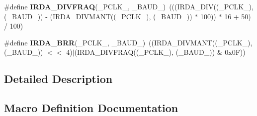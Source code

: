 \begin{DoxyCompactItemize}
\item 
\#define {\bfseries I\+R\+D\+A\+\_\+\+D\+I\+V\+F\+R\+AQ}(\+\_\+\+P\+C\+L\+K\+\_\+,  \+\_\+\+B\+A\+U\+D\+\_\+)~(((I\+R\+D\+A\+\_\+\+D\+IV((\+\_\+\+P\+C\+L\+K\+\_\+), (\+\_\+\+B\+A\+U\+D\+\_\+)) -\/ (I\+R\+D\+A\+\_\+\+D\+I\+V\+M\+A\+NT((\+\_\+\+P\+C\+L\+K\+\_\+), (\+\_\+\+B\+A\+U\+D\+\_\+)) $\ast$ 100)) $\ast$ 16 + 50) / 100)\hypertarget{group___i_r_d_a___private___macros_ga3245c6313dd792d63e20ca702f6f2a58}{}\label{group___i_r_d_a___private___macros_ga3245c6313dd792d63e20ca702f6f2a58}

\item 
\#define {\bfseries I\+R\+D\+A\+\_\+\+B\+RR}(\+\_\+\+P\+C\+L\+K\+\_\+,  \+\_\+\+B\+A\+U\+D\+\_\+)~((I\+R\+D\+A\+\_\+\+D\+I\+V\+M\+A\+NT((\+\_\+\+P\+C\+L\+K\+\_\+), (\+\_\+\+B\+A\+U\+D\+\_\+)) $<$$<$ 4)$\vert$(I\+R\+D\+A\+\_\+\+D\+I\+V\+F\+R\+AQ((\+\_\+\+P\+C\+L\+K\+\_\+), (\+\_\+\+B\+A\+U\+D\+\_\+)) \& 0x0\+F))\hypertarget{group___i_r_d_a___private___macros_ga5694b0652cf8290331bd421ee7740859}{}\label{group___i_r_d_a___private___macros_ga5694b0652cf8290331bd421ee7740859}

\end{DoxyCompactItemize}


\subsection{Detailed Description}


\subsection{Macro Definition Documentation}
